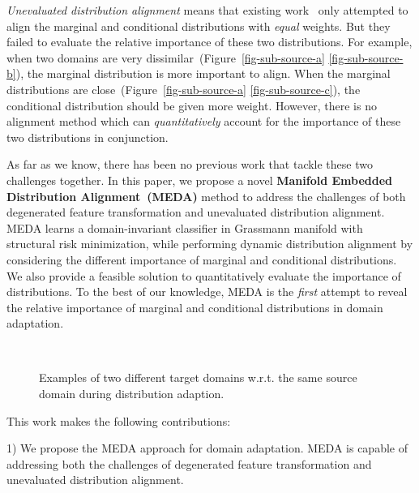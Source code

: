 \documentclass[sigconf]{acmart}
\begin{document}
\textit{Unevaluated distribution alignment} means that existing work~\cite{long2013transfer,hou2016unsupervised,zhang2017joint,tahmoresnezhad2016visual} only attempted to align the marginal and conditional distributions with \textit{equal} weights. But they failed to evaluate the relative importance of these two distributions. For example, when two domains are very dissimilar~(Figure~\ref{fig-sub-source-a}  \ref{fig-sub-source-b}), the marginal distribution is more important to align. When the marginal distributions are close~(Figure~\ref{fig-sub-source-a}  \ref{fig-sub-source-c}), the conditional distribution should be given more weight. However, there is no alignment method which can \textit{quantitatively} account for the importance of these two distributions in conjunction.

As far as we know, there has been no previous work that tackle these two challenges together. In this paper, we propose a novel \textbf{Manifold Embedded Distribution Alignment~(MEDA)} method to address the challenges of both degenerated feature transformation and unevaluated distribution alignment. MEDA learns a domain-invariant classifier in Grassmann manifold with structural risk minimization, while performing dynamic distribution alignment by considering the different importance of marginal and conditional distributions. We also provide a feasible solution to quantitatively evaluate the importance of distributions. To the best of our knowledge, MEDA is the \textit{first} attempt to reveal the relative importance of marginal and conditional distributions in domain adaptation.

\begin{figure}[t!]
	\centering
	\vspace{-.1in}
	~\vline
	~
	~
	\vspace{-.1in}
	\caption{Examples of two different target domains w.r.t. the same source domain during distribution adaption.}
	\label{fig-bda}
	\vspace{-.2in}
\end{figure}

This work makes the following contributions:

1) We propose the MEDA approach for domain adaptation. MEDA is capable of addressing both the challenges of degenerated feature transformation and unevaluated distribution alignment.
\end{document}
